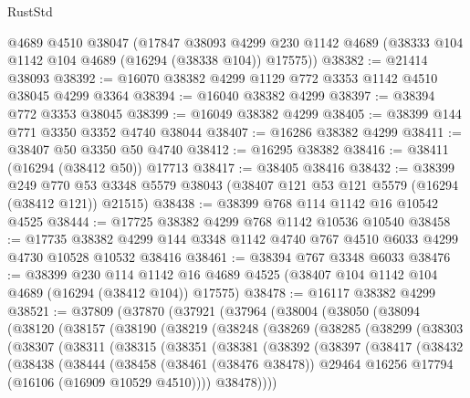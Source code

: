 \begin{lexlean}{RustStd}
\begin{coremodule}
    @4689
    @4510
    @38047
    (@17847
      @38093
      @4299
      @230
      @1142
      @4689
      (@38333 @104 @1142 @104 @4689 (@16294 (@38338 @104)) @17575))
@38382 := @21414 @38093
@38392 := @16070 @38382 @4299 @1129 @772 @3353 @1142 @4510 @38045 @4299 @3364
@38394 := @16040 @38382 @4299
@38397 := @38394 @772 @3353 @38045
@38399 := @16049 @38382 @4299
@38405 := @38399 @144 @771 @3350 @3352 @4740 @38044
@38407 := @16286 @38382 @4299
@38411 := @38407 @50 @3350 @50 @4740
@38412 := @16295 @38382
@38416 := @38411 (@16294 (@38412 @50)) @17713
@38417 := @38405 @38416
@38432 := @38399
    @249
    @770
    @53
    @3348
    @5579
    @38043
    (@38407 @121 @53 @121 @5579 (@16294 (@38412 @121)) @21515)
@38438 := @38399 @768 @114 @1142 @16 @10542 @4525
@38444 := @17725 @38382 @4299 @768 @1142 @10536 @10540
@38458 := @17735
    @38382
    @4299
    @144
    @3348
    @1142
    @4740
    @767
    @4510
    @6033
    @4299
    @4730
    @10528
    @10532
    @38416
@38461 := @38394 @767 @3348 @6033
@38476 := @38399
    @230
    @114
    @1142
    @16
    @4689
    @4525
    (@38407 @104 @1142 @104 @4689 (@16294 (@38412 @104)) @17575)
@38478 := @16117 @38382 @4299
@38521 := @37809
    (@37870
      (@37921
        (@37964
          (@38004
            (@38050
              (@38094
                (@38120
                  (@38157
                    (@38190
                      (@38219
                        (@38248
                          (@38269
                            (@38285
                              (@38299
                                (@38303
                                  (@38307
                                    (@38311
                                      (@38315
                                        (@38351
                                          (@38381
                                            (@38392
                                              (@38397
                                                (@38417
                                                  (@38432
                                                    (@38438
                                                      (@38444
                                                        (@38458
                                                          (@38461 (@38476 @38478))
                                                          @29464
                                                          @16256
                                                          @17794
                                                          (@16106 (@16909 @10529 @4510))))
                                                      @38478))))

\end{coremodule}
\end{lexlean}
